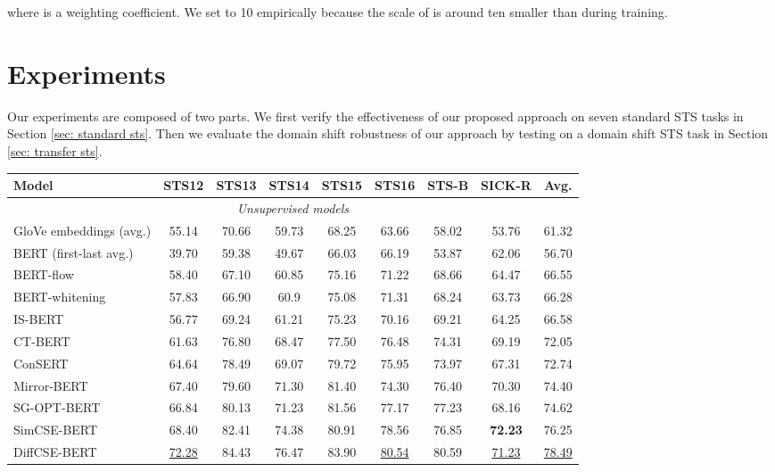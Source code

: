 \documentclass[11pt]{article}
\begin{document}
where  is a weighting coefficient. We set  to 10 empirically because the scale of  is around ten smaller than  during training.




\section{Experiments}
Our experiments are composed of two parts. We first verify the effectiveness of our proposed approach on seven standard STS tasks in Section \ref{sec: standard sts}. Then we evaluate the domain shift robustness of our approach by testing on a domain shift STS task in Section \ref{sec: transfer sts}. 

\begin{table*}[!t]
\small
\centering
\begin{tabular}{lcccccccc}
\toprule
\textbf{Model}                      & \textbf{STS12} & \textbf{STS13} & \textbf{STS14} & \textbf{STS15} & \textbf{STS16} & \textbf{STS-B} & \textbf{SICK-R} & \textbf{Avg.}  \\
\midrule
\midrule
\multicolumn{9}{c}{\textit{Unsupervised models}} \\\midrule
GloVe embeddings (avg.)    & 55.14 & 70.66 & 59.73 & 68.25 & 63.66 & 58.02 & 53.76  & 61.32 \\
BERT (first-last avg.) & 39.70  & 59.38 & 49.67 & 66.03 & 66.19 & 53.87 & 62.06  & 56.70  \\
BERT-flow              & 58.40  & 67.10  & 60.85 & 75.16 & 71.22 & 68.66 & 64.47  & 66.55 \\
BERT-whitening         & 57.83 & 66.90  & 60.9  & 75.08 & 71.31 & 68.24 & 63.73  & 66.28 \\
IS-BERT                & 56.77 & 69.24 & 61.21 & 75.23 & 70.16 & 69.21 & 64.25  & 66.58 \\
CT-BERT                & 61.63 & 76.80  & 68.47 & 77.50  & 76.48 & 74.31 & 69.19  & 72.05 \\
ConSERT                & 64.64 & 78.49 & 69.07 & 79.72 & 75.95 & 73.97 & 67.31  & 72.74 \\
Mirror-BERT            & 67.40  & 79.60  & 71.30  & 81.40  & 74.30  & 76.40  & 70.30   & 74.40  \\
SG-OPT-BERT            & 66.84 & 80.13 & 71.23 & 81.56 & 77.17 & 77.23 & 68.16  & 74.62 \\
SimCSE-BERT            & 68.40  & 82.41 & 74.38 & 80.91 & 78.56 & 76.85 & \textbf{72.23}  & 76.25 \\
DiffCSE-BERT           & \underline{72.28} & 84.43 & 76.47 & 83.90  & \underline{80.54} & 80.59 & \underline{71.23}  & \underline{78.49} \\

\end{tabular}
\end{table*}
\end{document}
